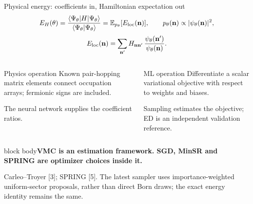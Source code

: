 \documentclass[aspectratio=169,10pt]{beamer}
\newcommand{\src}[1]{\vfill{\fontsize{6.3}{7.5}\selectfont\color{muted}#1\par}}
\newcommand{\take}[1]{\vspace{1mm}\begin{beamercolorbox}[sep=1.6mm,wd=\textwidth]{block body}\small\color{teal}\textbf{#1}\end{beamercolorbox}}
\newcommand{\E}{\mathbb E}
\newcommand{\ket}[1]{\lvert #1\rangle}
\newcommand{\bra}[1]{\langle #1\rvert}
\newcommand{\nn}{\mathbf n}
\begin{document}
\begin{frame}{Physical energy: coefficients in, Hamiltonian expectation out}
\[
E_H(\theta)=\frac{\bra{\Psi_\theta}H\ket{\Psi_\theta}}
{\langle\Psi_\theta|\Psi_\theta\rangle}
=\E_{p_\theta}[E_{\rm loc}(\nn)],
\qquad p_\theta(\nn)\propto|\psi_\theta(\nn)|^2,
\]
\[
E_{\rm loc}(\nn)=\sum_{\nn'}H_{\nn\nn'}\,
\frac{\psi_\theta(\nn')}{\psi_\theta(\nn)}.
\]
\begin{columns}[T,onlytextwidth]
\begin{block}{Physics operation}
Known pair-hopping matrix elements connect occupation arrays; fermionic signs are included.\par\medskip
The neural network supplies the coefficient ratios.
\end{block}
\begin{block}{ML operation}
Differentiate a scalar variational objective with respect to weights and biases.\par\medskip
Sampling estimates the objective; ED is an independent validation reference.
\end{block}
\end{columns}
\take{VMC is an estimation framework. SGD, MinSR and SPRING are optimizer choices inside it.}
\src{Carleo--Troyer [3]; SPRING [5]. The latest sampler uses importance-weighted uniform-sector proposals, rather than direct Born draws; the exact energy identity remains the same.}
\end{frame}
\end{document}
